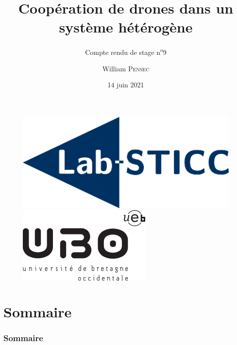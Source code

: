 \documentclass[12pt]{beamer}
\title[Compte rendu de stage n\textsuperscript{o}9]{Coopération de drones dans un système hétérogène}
\subtitle{Compte rendu de stage n\textsuperscript{o}9}
\author{William \textsc{Pensec}}
\institute[Lab-STICC]{Lab-Sticc}
\date{14 juin 2021}
\begin{document}
	\begin{frame}
		\begin{titlepage}
			\begin{figure}[H]
				\centering
				\includegraphics[scale=.15]{labsticc.png}
				\hspace{3cm}
				\includegraphics[scale=.3]{ubo.png}
			\end{figure}
		\end{titlepage}
	\end{frame}
	
	\section*{Sommaire}
	\begin{frame}
		\frametitle{Sommaire}
		\begin{center}
			\tableofcontents
		\end{center}
	\end{frame}
\end{document}
